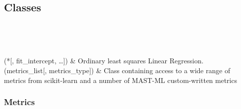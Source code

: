 \documentclass[letterpaper,10pt,english]{sphinxmanual}
\begin{document}
\subsection{Classes}
\label{\detokenize{10_metrics:classes}}

\begin{savenotes}\sphinxatlongtablestart\begin{longtable}[c]{}
\hline

\endfirsthead

%
{}\\
\hline

\endhead

\hline
{}\\
\endfoot

\endlastfoot

(*{[}, fit\_intercept, …{]})
&
Ordinary least squares Linear Regression.
\\
\hline
{\hyperref[\detokenize{api/mastml.metrics.Metrics:mastml.metrics.Metrics}]{}}(metrics\_list{[}, metrics\_type{]})
&
Class containing access to a wide range of metrics from scikit-learn and a number of MAST-ML custom-written metrics
\\
\hline
\end{longtable}\sphinxatlongtableend\end{savenotes}


\subsubsection{Metrics}
\label{\detokenize{api/mastml.metrics.Metrics:metrics}}\label{\detokenize{api/mastml.metrics.Metrics::doc}}
\end{document}
